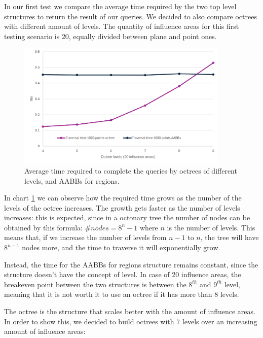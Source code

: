 \documentclass{PoliMi_MasterThesis}
\begin{document}
In our first test we compare the average time required by the two top level structures to return the result of our queries. We decided to also compare octrees with different amount of levels. The quantity of influence areas for this first testing scenario is $20$, equally divided between plane and point ones.

\begin{figure}[H] 
	\centering
	\includegraphics[width=0.9\textwidth]{Images/octree_vs_aabbs_traversal_chart.png}
	\caption{Average time required to complete the queries by octrees of different levels, and AABBs for regions.}
	\label{fig:octree_vs_aabbs_traversal_chart}
\end{figure}

In chart \ref{fig:octree_vs_aabbs_traversal_chart} we can observe how the required time grows as the number of the levels of the octree increases. The growth gets faster as the number of levels increases: this is expected, since in a octonary tree the number of nodes can be obtained by this formula: $\#nodes = 8^n-1$ where $n$ is the number of levels. This means that, if we increase the number of levels from $n-1$ to $n$, the tree will have $8^{n-1}$ nodes more, and the time to traverse it will exponentially grow.

Instead, the time for the AABBs for regions structure remains constant, since the structure doesn't have the concept of level. In case of 20 influence areas, the breakeven point between the two structures is between the $8^{th}$ and $9^{th}$ level, meaning that it is not worth it to use an octree if it has more than $8$ levels.

The octree is the structure that scales better with the amount of influence areas. In order to show this, we decided to build octrees with $7$ levels over an increasing amount of influence areas:
\end{document}
